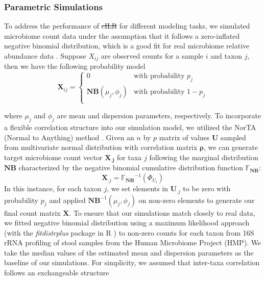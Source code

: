 \documentclass[10pt,letterpaper]{article}
\providecommand{\DIFaddtex}[1]{{\protect\color{blue}\uwave{#1}}} %
\providecommand{\DIFdeltex}[1]{{\protect\color{red}\sout{#1}}}                      %
\providecommand{\DIFaddbegin}{} %
\providecommand{\DIFaddend}{} %
\providecommand{\DIFdelbegin}{} %
\providecommand{\DIFdelend}{} %
\providecommand{\DIFadd}[1]{\texorpdfstring{\DIFaddtex{#1}}{#1}} %
\providecommand{\DIFdel}[1]{\texorpdfstring{\DIFdeltex{#1}}{}} %
\newcommand{\DIFscaledelfig}{0.5}
\newlength{\DIFdelgraphicswidth} %
\newlength{\DIFdelgraphicsheight} %
\newcommand{\DIFaddincludegraphics}[2][]{{\color{blue}\fbox{\DIFOincludegraphics[#1]{#2}}}} %
\newcommand{\DIFdelincludegraphics}[2][]{%
\sbox{\DIFdelgraphicsbox}{\DIFOincludegraphics[#1]{#2}}%
\settoboxwidth{\DIFdelgraphicswidth}{\DIFdelgraphicsbox} %
\settoboxtotalheight{\DIFdelgraphicsheight}{\DIFdelgraphicsbox} %
\scalebox{\DIFscaledelfig}{%
\parbox[b]{\DIFdelgraphicswidth}{\usebox{\DIFdelgraphicsbox}\\[-\baselineskip] \rule{\DIFdelgraphicswidth}{0em}}\llap{\resizebox{\DIFdelgraphicswidth}{\DIFdelgraphicsheight}{%
\setlength{\unitlength}{\DIFdelgraphicswidth}%
\begin{picture}(1,1)%
\thicklines\linethickness{2pt} %
{\color[rgb]{1,0,0}\put(0,0){\framebox(1,1){}}}%
{\color[rgb]{1,0,0}\put(0,0){\line( 1,1){1}}}%
{\color[rgb]{1,0,0}\put(0,1){\line(1,-1){1}}}%
\end{picture}%
}\hspace*{3pt}}} %
} %
\DeclareRobustCommand{\DIFaddbegin}{\DIFOaddbegin \let\includegraphics\DIFaddincludegraphics} %
\DeclareRobustCommand{\DIFaddend}{\DIFOaddend \let\includegraphics\DIFOincludegraphics} %
\DeclareRobustCommand{\DIFdelbegin}{\DIFOdelbegin \let\includegraphics\DIFdelincludegraphics} %
\DeclareRobustCommand{\DIFdelend}{\DIFOaddend \let\includegraphics\DIFOincludegraphics} %
\begin{document}
\subsubsection*{Parametric Simulations}  
To address the performance of \DIFdelbegin \DIFdel{cILR }\DIFdelend \DIFaddbegin \DIFadd{CBEA }\DIFaddend for different modeling tasks, we simulated microbiome count data under the assumption that it follows a zero-inflated negative binomial distribution, which is a good fit for real microbiome relative abundance data \cite{calgaro2020}. Suppose $X_{ij}$ are observed counts for a sample $i$ and taxon $j$, then we have the following probability model
\begin{equation}
    \mathbf{X}_{ij} =
      \begin{cases}
        0 & \text{with probability $p_j$}\\
        \mathbf{NB}(\mu_j, \phi_j) & \text{with probability $1 - p_j$}\\
      \end{cases}       
\end{equation}

where $\mu_j$ and $\phi_j$ are mean and dispersion parameters, respectively. To incorporate a flexible correlation structure into our simulation model, we utilized the NorTA (Normal to Anything) method \cite{cario1997}. Given an $n$ by $p$ matrix of values $\mathbf{U}$ sampled from multivariate normal distribution with correlation matrix $\mathbf{\rho}$, we can generate target microbiome count vector $\mathbf{X_{.j}}$ for taxa $j$ following the marginal distribution $\mathbf{NB}$ characterized by the negative binomial cumulative distribution function $\mathbb{F_{\mathbf{NB}}}$:
\begin{equation}
    \mathbf{X}_{.j} = \mathbb{F_{\mathbf{NB}}}^{-1}(\Phi_{U_i})
\end{equation}
In this instance, for each taxon $j$, we set elements in $\mathbf{U}_{.j}$ to be zero with probability $p_j$ and applied $\mathbf{NB}^{-1}(\mu_j, \phi_j)$ on non-zero elements to generate our final count matrix $\mathbf{X}$. To ensure that our simulations match closely to real data, we fitted negative binomial distribution using a maximum likelihood approach (with the \emph{fitdistrplus} package in R \cite{delignette-muller2015}) to non-zero counts for each taxon from 16S rRNA profiling of stool samples from the Human Microbiome Project (HMP). We take the median values of the estimated mean and dispersion parameters as the baseline of our simulations. For simplicity, we assumed that inter-taxa correlation follows an exchangeable structure
\end{document}
